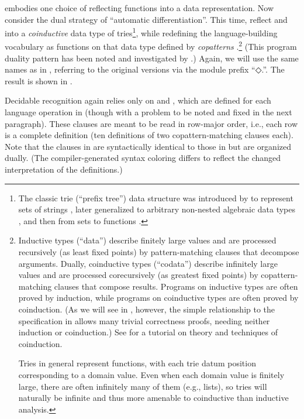 \documentclass[acmsmall,screen,timestamp]{acmart}  %
\begin{document}
\rnc{}

 embodies one choice of reflecting functions into a data representation.
Now consider the dual strategy of ``automatic differentiation''.
This time, reflect  and  into a \emph{coinductive} data type of tries\footnote{The classic trie (``prefix tree'') data structure was introduced by \citet{Thue1912Gegenseitige} to represent sets of strings \citep[Section 6.3]{Knuth1998ACP3}, later generalized to arbitrary non-nested algebraic data types \citep{Connelly1995GenTrie}, and then from sets to functions \citep{Hinze2000GGT}.}, while redefining the language-building vocabulary as functions on that data type defined by \emph{copatterns} \citep{AbelEtAl12013, AbelPientka2016}.\footnote{Inductive types (``data'') describe finitely large values and are processed recursively (as least fixed points) by pattern-matching clauses that decompose arguments.
Dually, coinductive types (``codata'') describe infinitely large values and are processed corecursively (as greatest fixed points) by copattern-matching clauses that compose results.
Programs on inductive types are often proved by induction, while programs on coinductive types are often proved by coinduction.
(As we will see in , however, the simple relationship to the specification in  allows many trivial correctness proofs, needing neither induction or coinduction.)
See \citet{Gordon1995:coinduction} for a tutorial on theory and techniques of coinduction.

Tries in general represent functions, with each trie datum position corresponding to a domain value.
Even when each domain value is finitely large, there are often infinitely many of them (e.g., lists), so tries will naturally be infinite and thus more amenable to coinductive than inductive analysis.}
(This program duality pattern has been noted and investigated by \citet{OstermannJabs2018}.)
Again, we will use the same names as in , referring to the original versions via the module prefix ``{◇.}\hspace{0.05em}''.
The result is shown in .

Decidable recognition again relies only on  and , which are defined for each language operation in  (though with a problem to be noted and fixed in the next paragraph).
These clauses are meant to be read in row-major order, i.e., each row is a complete definition (ten definitions of two copattern-matching clauses each).
Note that the clauses in  are syntactically identical to those in  but are organized dually.
(The compiler-generated syntax coloring differs to reflect the changed interpretation of the definitions.)
\end{document}
